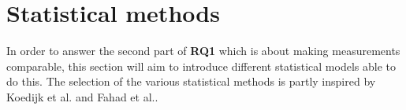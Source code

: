 \section{Statistical methods}\label{sec:stat}

In order to answer the second part of \textbf{RQ1} which is about making measurements comparable, this section will aim to introduce different statistical models able to do this. The selection of the various statistical methods is partly inspired by Koedijk et al.\cite{Koedijk2022diff} and Fahad et al.\cite{fahad2019comparative}.



